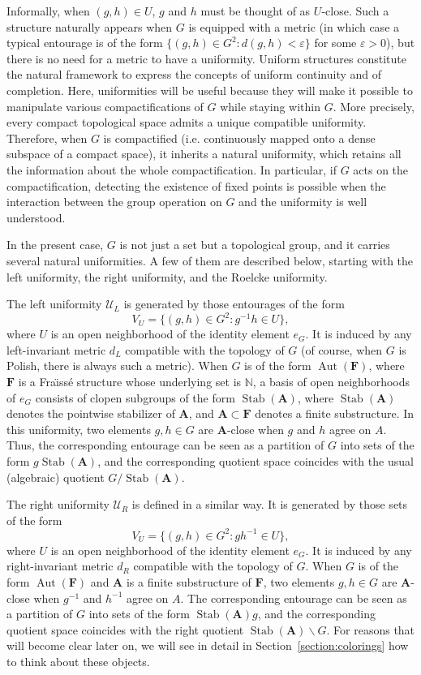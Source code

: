 \documentclass[11pt]{article}
\theoremstyle{definition}
\numberwithin{equation}{section}
\numberwithin{figure}{section}
\numberwithin{table}{section}
\newcommand{\N}{\mathbb{N}}
\newcommand*{\mA}{\mathbf{A}}
\newcommand*{\mF}{\mathbf{F}}
\newcommand{\e}{\varepsilon}
\DeclareMathOperator{\Aut}{Aut}
\DeclareMathOperator{\Stab}{Stab}
\begin{document}
Informally, when $(g,h)\in U$, $g$ and $h$ must be thought of as $U$-close. Such a structure naturally appears when $G$ is equipped with a metric (in which case a typical entourage is of the form $\{ (g,h) \in G^{2}: d(g,h)<\e\}$ for some $\e>0$), but there is no need for a metric to have a uniformity. Uniform structures constitute the natural framework to express the concepts of uniform continuity and of completion. Here, uniformities will be useful because they will make it possible to manipulate various compactifications of $G$ while staying within $G$. More precisely, every compact topological space admits a unique compatible uniformity. Therefore, when $G$ is compactified (i.e. continuously mapped onto a dense subspace of a compact space), it inherits a natural uniformity, which retains all the information about the whole compactification. In particular, if $G$ acts on the compactification, detecting the existence of fixed points is possible when the interaction between the group operation on $G$ and the uniformity is well understood.

In the present case, $G$ is not just a set but a topological group, and it carries several natural uniformities. A few of them are described below, starting with the left uniformity, the right uniformity, and the Roelcke uniformity.

The left uniformity $\mathcal U_{L}$ is generated by those entourages of the form
\[
V_{U}=\{ (g,h)\in G^{2}: g^{-1}h\in U\},
\]
where $U$ is an open neighborhood of the identity element $e_{G}$. It is induced by any left-invariant metric $d_{L}$ compatible with the topology of $G$ (of course, when $G$ is Polish, there is always such a metric). When $G$ is of the form $\Aut(\mF)$, where $\mF$ is a Fra\"{\i}ss\'e structure whose underlying set is $\N$, a basis of open neighborhoods of $e_{G}$ consists of clopen subgroups of the form $\Stab(\mA)$, where $\Stab(\mA)$ denotes the pointwise stabilizer of $\mA$, and $\mA\subset \mF$ denotes a finite substructure. In this uniformity, two elements $g, h\in G$ are $\mA$-close when $g$ and $h$ agree on $A$. Thus, the corresponding entourage can be seen as a partition of $G$ into sets of the form $g\Stab(\mA)$, and the corresponding quotient space coincides with the usual (algebraic) quotient $G/\Stab(\mA)$.

The right uniformity $\mathcal U_{R}$ is defined in a similar way. It is generated by those sets of the form
\[
V_{U}=\{ (g,h)\in G^{2}: gh^{-1}\in U\},
\]
where $U$ is an open neighborhood of the identity element $e_{G}$. It is induced by any right-invariant metric $d_{R}$ compatible with the topology of $G$. When $G$ is of the form $\Aut(\mF)$ and $\mA$ is a finite substructure of $\mF$, two elements $g, h\in G$ are $\mA$-close when $g^{-1}$ and $h^{-1}$ agree on $A$. The corresponding entourage can be seen as a partition of $G$ into sets of the form $\Stab(\mA)g$, and the corresponding quotient space coincides with the right quotient $\Stab(\mA)\backslash G$. For reasons that will become clear later on, we will see in detail in Section~\ref{section:colorings} how to think about these objects.
\end{document}
